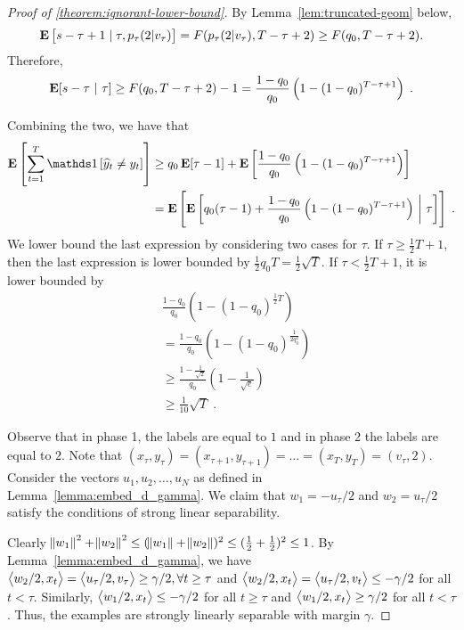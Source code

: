\begin{proof}[Proof of \autoref{theorem:ignorant-lower-bound}]
By Lemma~\ref{lem:truncated-geom} below,
\[
  \operatorname*{\mathbf{E}}\left[s-\tau+1 \mid \tau, p_\tau(2|v_\tau) \right] = F(p_\tau(2|v_\tau), T-\tau+2) \geq F(q_0, T-\tau+2).
\]
Therefore,
$$
\operatorname*{\mathbf{E}}[s-\tau ~|~ \tau]
\ge
F(q_0, T-\tau+2) - 1
=
\frac{1-q_0}{q_0}\left(1-(1-q_0)^{T-\tau+1}\right) \; .
$$







Combining the two, we have that
\begin{align*}
 \Exp \left[\sum_{t=1}^T \indicator{\widehat y_t\neq y_t}\right]
& \ge q_0 \Exp[\tau - 1] + \Exp \left[\frac{1-q_0}{q_0}\left(1-(1-q_0)^{T-\tau+1}\right)\right] \\
& =  \Exp \left[ \Exp \left[ q_0 (\tau - 1) + \frac{1-q_0}{q_0}\left(1-(1-q_0)^{T-\tau+1}\right) ~\middle|~ \tau \right] \right] \; .
\end{align*}
We lower bound the last expression by considering two cases for $\tau$.
If $\tau \ge \frac{1}{2}T + 1$, then the last expression is lower bounded by
$\frac{1}{2}q_0 T = \frac{1}{2} \sqrt{T}$. If
$\tau < \frac{1}{2}T+1$, it is lower bounded by
\begin{align*}
& \frac{1-q_0}{q_0}\left(1-(1-q_0)^{\frac{1}{2}T}\right) \\
& = \frac{1-q_0}{q_0}\left(1-(1-q_0)^{\frac{1}{2q_0^2}}\right) \\
& \ge \frac{1-\frac{1}{\sqrt{2}}}{q_0}\left(1-\frac{1}{\sqrt{e}}\right) \\
& \ge \frac{1}{10} \sqrt{T} \; .
\end{align*}

Observe that in phase 1, the labels are equal to $1$ and in phase 2 the labels
are equal to $2$. Note that $(x_\tau, y_\tau)=(x_{\tau+1}, y_{\tau+1})= \dots =
(x_T, y_T) = (v_\tau, 2)$. Consider the vectors $u_1, u_2, \dots, u_N$ as
defined in Lemma~\ref{lemma:embed_d_gamma}. We claim that $w_1=-u_\tau/2$ and
$w_2=u_\tau/2$ satisfy the conditions of strong linear separability.

Clearly $\norm{w_1}^2 + \norm{w_2}^2 \le (\norm{w_1} + \norm{w_2})^2 \le
(\frac{1}{2} + \frac{1}{2})^2 \le 1$. By Lemma~\ref{lemma:embed_d_gamma}, we
have $\left\langle w_2/2, x_t \right\rangle = \left\langle u_\tau/2, v_\tau \right\rangle \ge \gamma/2, \forall t \ge \tau$ and
$\left\langle w_2/2, x_t \right\rangle = \left\langle u_\tau/2, v_t \right\rangle \le - \gamma/2$ for all $t < \tau$. Similarly,
$\left\langle w_1/2, x_t \right\rangle \le -\gamma/2$ for all $t \ge \tau$ and $\left\langle w_1/2, x_t \right\rangle \ge
\gamma/2$ for all $t < \tau$. Thus, the examples are strongly linearly
separable with margin $\gamma$.
\end{proof}

